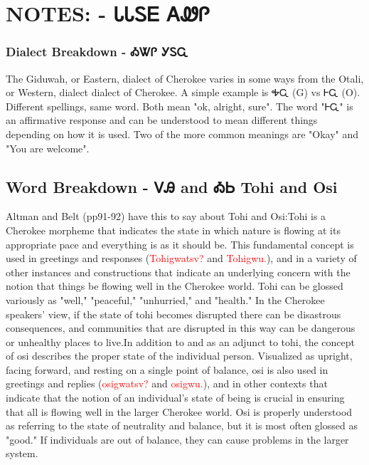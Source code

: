 \chapter{NOTES: - ᏓᏓᏚᎬ ᎪᏪᎵ 
}
\subsection{Dialect Breakdown - ᎣᏔᎵ  ᎩᏚᏩ}
The Giduwah, or Eastern, dialect of Cherokee varies in some ways from the Otali, or Western, dialect dialect of Cherokee.  A simple example is ᎭᏩ (G) vs ᎰᏩ (O).  Different spellings, same word.  Both mean "ok, alright, sure".  The word "ᎰᏩ" is an affirmative response and can be understood to mean different things depending on how it is used. Two of the more common meanings are "Okay" and "You are welcome".\cite{joynerlesson4}

\label{sec:wordBreakdownTohiOsi}\section{Word Breakdown - ᏙᎯ and ᎣᏏ Tohi and Osi}Altman and Belt (pp91-92) have this to say about Tohi and Osi:Tohi is a Cherokee morpheme that indicates the state in which nature is flowing at its appropriate pace and everything is as it should be. This fundamental concept is used in greetings and responses (\textcolor{red}{Tohigwatsv?} and \textcolor{red}{Tohigwu.}), and in a variety of other instances and constructions that indicate an underlying concern with the notion that things be flowing well in the Cherokee world. Tohi can be glossed variously as "well," "peaceful," "unhurried," and "health." In the Cherokee speakers' view, if the state of tohi becomes disrupted there can be disastrous consequences, and communities that are disrupted in this way can be dangerous or unhealthy places to live.In addition to and as an adjunct to tohi, the concept of osi describes the proper state of the individual person. Visualized as upright, facing forward, and resting on a single point of balance, osi is also used in greetings and replies (\textcolor{red}{osigwatsv?} and \textcolor{red}{osigwu.}), and in other contexts that indicate that the notion of an individual’s state of being is crucial in ensuring that all is flowing well in the larger Cherokee world. Osi is properly understood as referring to the state of neutrality and balance, but it is most often glossed as "good." If individuals are out of balance, they can cause problems in the larger system.\cite{altmanBelt90-98}

